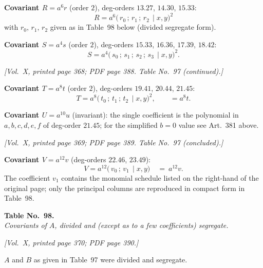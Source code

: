 \documentclass[11pt]{article}
\begin{document}
\medskip

\noindent\textbf{Covariant $R=a^{6}r$} (order $2$), deg-orders $13.27$, $14.30$, $15.33$:
\[
R=a^{6}\bigl(\,r_{0}\,;\,r_{1}\,;\,r_{2}\,\mid x,y\bigr)^{2}
\]
with $r_{0},\,r_{1},\,r_{2}$ given as in Table~98 below (divided segregate form).

\medskip

\noindent\textbf{Covariant $S=a^{4}s$} (order $2$), deg-orders $15.33$, $16.36$, $17.39$, $18.42$:
\[
S=a^{4}\bigl(\,s_{0}\,;\,s_{1}\,;\,s_{2}\,;\,s_{3}\,\mid x,y\bigr)^{2}.
\]

\newpage

\noindent\textit{[Vol.~X, printed page 368; PDF page 388. Table No.~97 (continued).]}

\medskip

\noindent\textbf{Covariant $T=a^{8}t$} (order $2$), deg-orders $19.41$, $20.44$, $21.45$:
\[
T=a^{8}\bigl(\,t_{0}\,;\,t_{1}\,;\,t_{2}\,\mid x,y\bigr)^{2}, \qquad =a^{8}t.
\]

\medskip

\noindent\textbf{Covariant $U=a^{10}u$} (invariant): the single coefficient is the polynomial in $a,b,c,d,e,f$ of deg-order $21.45$; for the simplified $b=0$ value see Art.~381 above.

\newpage

\noindent\textit{[Vol.~X, printed page 369; PDF page 389. Table No.~97 (concluded).]}

\medskip

\noindent\textbf{Covariant $V=a^{12}v$} (deg-orders $22.46$, $23.49$):
\[
V=a^{12}\bigl(\,v_{0}\,;\,v_{1}\,\mid x,y\bigr)\quad =\ a^{12}v.
\]
The coefficient $v_{1}$ contains the monomial schedule listed on the right-hand of the original page; only the principal columns are reproduced in compact form in Table~98.

\bigskip
\bigskip

\begin{center}
\textbf{Table No.~98.} \\[2pt]
\textit{Covariants of $A$, divided and (except as to a few coefficients) segregate.}
\end{center}

\medskip

\noindent\textit{[Vol.~X, printed page 370; PDF page 390.]}

\medskip

\noindent$A$ and $B$ as given in Table~97 were divided and segregate.

\medskip
\end{document}
